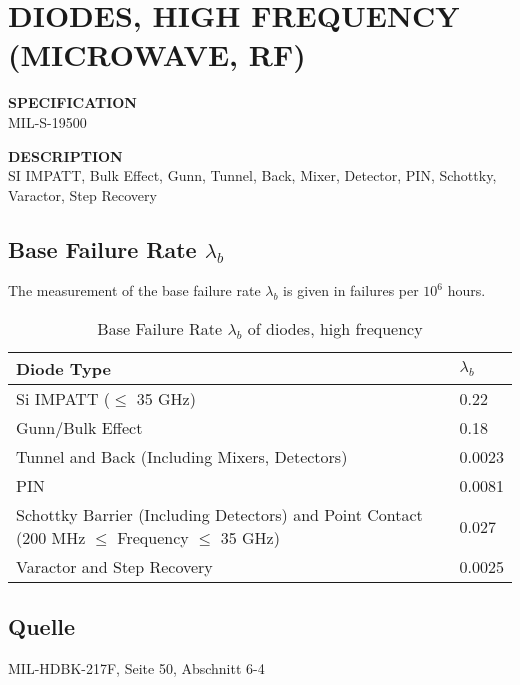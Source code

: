 \section{DIODES, HIGH FREQUENCY (MICROWAVE, RF)}

\begin{minipage}[t]{0.29\textwidth}
    \textbf{SPECIFICATION}\\
    MIL-S-19500
\end{minipage}
\begin{minipage}[t]{0.7\textwidth}
    \textbf{DESCRIPTION}\\
    {\fontsize{12pt}{12pt}\selectfont SI IMPATT, Bulk Effect, Gunn, Tunnel, Back, Mixer,
    Detector, PIN, Schottky, Varactor, Step Recovery}
\end{minipage}

\subsection{Base Failure Rate $\lambda_b$}
The measurement of the base failure rate $\lambda_b$ is given in failures per $10^6$ hours.
\begin{table}[ht]
{\centering

\begin{tabular}{|p{9cm}|p{4cm}|}
    \hline
    \textbf{Diode Type} & \textbf{$\lambda_b$} \\
    \hline
    Si IMPATT ($\le$ 35 GHz) & 0.22 \\
    \hline
    Gunn/Bulk Effect & 0.18 \\
    \hline
    Tunnel and Back (Including Mixers, Detectors) & 0.0023 \\
    \hline
    PIN & 0.0081 \\
    \hline
    Schottky Barrier (Including Detectors) and Point Contact (200 MHz $\le$ Frequency $\le$ 35 GHz) & 0.027 \\
    \hline
    Varactor and Step Recovery & 0.0025 \\
    \hline
\end{tabular}

\caption{Base Failure Rate $\lambda_b$ of diodes, high frequency}

\label{tab:bfr_diodes_high_frequency}
\par}
\subsection*{Quelle}
MIL-HDBK-217F, Seite 50, Abschnitt 6-4
\end{table}